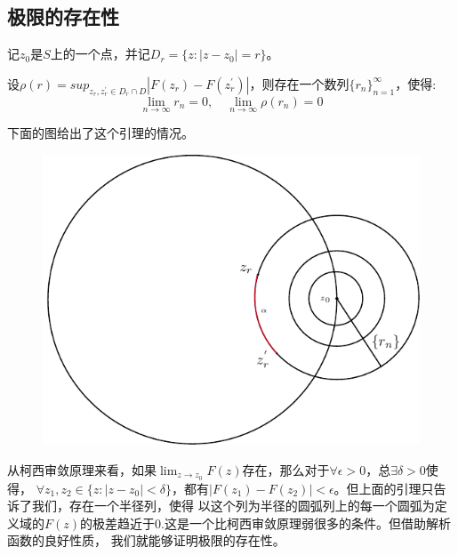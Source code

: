 \documentclass[UTF8]{ctexart}[a4paper,10pt]
\begin{document}
    \subsection{极限的存在性}
    \begin{lem}
        记$z_0$是$S$上的一个点，并记$D_r=\{z:|z-z_0|=r\}$。
        
        设$\rho(r)=sup_{z_r,z_r^{'}\in D_r\cap D }|F(z_r)-F(z_r^{'})|$，则存在一个数列$\{r_n\}_{n=1}^{\infty}$，使得:
        $$
        \lim_{n\to \infty}r_n=0     , \quad   \lim_{n\to \infty}\rho(r_n)=0
        $$
    \end{lem}
    下面的图给出了这个引理的情况。
    \begin{figure}[H]
        \centering
        \includegraphics[scale=0.4]{引理1.pdf}
    \end{figure}
    从柯西审敛原理来看，如果$\lim_{z \to z_0} F(z)$存在，那么对于$\forall \epsilon>0$，总$\exists \delta>0$使得，
     $\forall z_1,z_2 \in \{z:|z-z_0|<\delta\}$，都有$|F(z_1)-F(z_2)|<\epsilon$。但上面的引理只告诉了我们，存在一个半径列，使得
     以这个列为半径的圆弧列上的每一个圆弧为定义域的$F(z)$的极差趋近于0.这是一个比柯西审敛原理弱很多的条件。但借助解析函数的良好性质，
     我们就能够证明极限的存在性。
\end{document}
